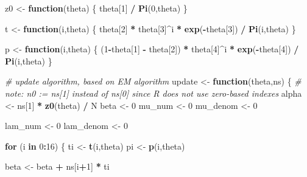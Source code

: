 \documentclass[
]{article}
\newenvironment{Shaded}{\begin{snugshade}}{\end{snugshade}}
\newcommand{\CommentTok}[1]{\textcolor[rgb]{0.56,0.35,0.01}{\textit{#1}}}
\newcommand{\ControlFlowTok}[1]{\textcolor[rgb]{0.13,0.29,0.53}{\textbf{#1}}}
\newcommand{\DecValTok}[1]{\textcolor[rgb]{0.00,0.00,0.81}{#1}}
\newcommand{\FunctionTok}[1]{\textcolor[rgb]{0.13,0.29,0.53}{\textbf{#1}}}
\newcommand{\NormalTok}[1]{#1}
\newcommand{\OtherTok}[1]{\textcolor[rgb]{0.56,0.35,0.01}{#1}}
\newcommand{\SpecialCharTok}[1]{\textcolor[rgb]{0.81,0.36,0.00}{\textbf{#1}}}
\begin{document}
\begin{Shaded}
\begin{Highlighting}[]
\NormalTok{z0 }\OtherTok{\textless{}{-}} \ControlFlowTok{function}\NormalTok{(theta)}
\NormalTok{\{}
\NormalTok{  theta[}\DecValTok{1}\NormalTok{] }\SpecialCharTok{/} \FunctionTok{Pi}\NormalTok{(}\DecValTok{0}\NormalTok{,theta)}
\NormalTok{\}}

\NormalTok{t }\OtherTok{\textless{}{-}} \ControlFlowTok{function}\NormalTok{(i,theta)}
\NormalTok{\{}
\NormalTok{  theta[}\DecValTok{2}\NormalTok{] }\SpecialCharTok{*}\NormalTok{ theta[}\DecValTok{3}\NormalTok{]}\SpecialCharTok{\^{}}\NormalTok{i }\SpecialCharTok{*} \FunctionTok{exp}\NormalTok{(}\SpecialCharTok{{-}}\NormalTok{theta[}\DecValTok{3}\NormalTok{]) }\SpecialCharTok{/} \FunctionTok{Pi}\NormalTok{(i,theta)}
\NormalTok{\}}

\NormalTok{p }\OtherTok{\textless{}{-}} \ControlFlowTok{function}\NormalTok{(i,theta)}
\NormalTok{\{}
\NormalTok{  (}\DecValTok{1}\SpecialCharTok{{-}}\NormalTok{theta[}\DecValTok{1}\NormalTok{] }\SpecialCharTok{{-}}\NormalTok{ theta[}\DecValTok{2}\NormalTok{]) }\SpecialCharTok{*}\NormalTok{ theta[}\DecValTok{4}\NormalTok{]}\SpecialCharTok{\^{}}\NormalTok{i }\SpecialCharTok{*} \FunctionTok{exp}\NormalTok{(}\SpecialCharTok{{-}}\NormalTok{theta[}\DecValTok{4}\NormalTok{]) }\SpecialCharTok{/} \FunctionTok{Pi}\NormalTok{(i,theta)}
\NormalTok{\}}

\CommentTok{\# update algorithm, based on EM algorithm}
\NormalTok{update }\OtherTok{\textless{}{-}} \ControlFlowTok{function}\NormalTok{(theta,ns)}
\NormalTok{\{}
  \CommentTok{\# note: n0 := ns[1] instead of ns[0] since R does not use zero{-}based indexes}
\NormalTok{  alpha }\OtherTok{\textless{}{-}}\NormalTok{ ns[}\DecValTok{1}\NormalTok{] }\SpecialCharTok{*} \FunctionTok{z0}\NormalTok{(theta) }\SpecialCharTok{/}\NormalTok{ N}
\NormalTok{  beta }\OtherTok{\textless{}{-}} \DecValTok{0}
\NormalTok{  mu\_num }\OtherTok{\textless{}{-}} \DecValTok{0}
\NormalTok{  mu\_denom }\OtherTok{\textless{}{-}} \DecValTok{0}
  
\NormalTok{  lam\_num }\OtherTok{\textless{}{-}} \DecValTok{0}
\NormalTok{  lam\_denom }\OtherTok{\textless{}{-}} \DecValTok{0}

  \ControlFlowTok{for}\NormalTok{ (i }\ControlFlowTok{in} \DecValTok{0}\SpecialCharTok{:}\DecValTok{16}\NormalTok{)}
\NormalTok{  \{}
\NormalTok{    ti }\OtherTok{\textless{}{-}} \FunctionTok{t}\NormalTok{(i,theta)}
\NormalTok{    pi }\OtherTok{\textless{}{-}} \FunctionTok{p}\NormalTok{(i,theta)}
    
\NormalTok{    beta }\OtherTok{\textless{}{-}}\NormalTok{ beta }\SpecialCharTok{+}\NormalTok{ ns[i}\SpecialCharTok{+}\DecValTok{1}\NormalTok{] }\SpecialCharTok{*}\NormalTok{ ti}
    

\end{Highlighting}
\end{Shaded}
\end{document}
